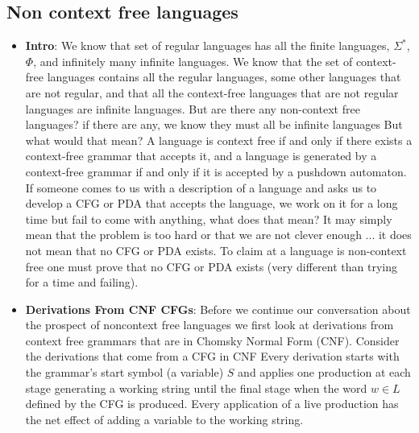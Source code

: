 \documentclass{report}
\begin{document}
    \subsection{Non context free languages}
    \begin{itemize}
        \item \textbf{Intro}:
            We know that set of regular languages has all the finite languages, $\Sigma^{*}$, $\Phi$, and infinitely many infinite languages.
            \bigbreak \noindent 
            We know that the set of context-free languages contains all the regular languages, some other languages that are not regular, and that all the context-free languages that are not regular languages are infinite languages.
            \bigbreak \noindent 
            But are there any non-context free languages?  if there are any, we know they must all be infinite languages
            \bigbreak \noindent 
            But what would that mean? 
            \bigbreak \noindent 
            A language is context free if and only if there exists a context-free grammar that accepts it, and
            \bigbreak \noindent 
                a language is generated by a context-free grammar if and only if it is accepted by a pushdown automaton.
                \bigbreak \noindent 
                If someone comes to us with a description of a language and asks us to develop a CFG or PDA that accepts the language, we work on it for a long time but fail to come with anything, what does that mean?
                \bigbreak \noindent 
                It may simply mean that the problem is too hard or that we are not clever enough ... it does not mean that no CFG or PDA exists.
                \bigbreak \noindent 
                To claim at a language is non-context free one must prove that no CFG or PDA exists (very different than trying for a time and failing).
        \item \textbf{Derivations From CNF CFGs}: Before we continue our conversation about the prospect of noncontext free languages we first look at derivations from context free grammars that are in Chomsky Normal Form (CNF).
            \bigbreak \noindent 
            Consider the derivations that come from a CFG in CNF
            \bigbreak \noindent 
            Every derivation starts with the grammar’s start symbol (a variable) $S$ and applies one production at each stage generating a working string until the final stage when the word $w \in L$ defined by the CFG is produced.
            \bigbreak \noindent 
            Every application of a live production has the net effect of adding a variable to the working string.

\end{itemize}
\end{document}
